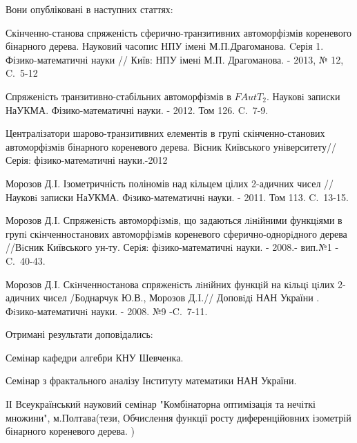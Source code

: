 \documentclass[a4paper,12pt]{article} \usepackage{a4wide}
\numberwithin{equation}{subsection}
\begin{document}
 Вони опубліковані в наступних статтях:


{ Скінченно-станова спряженість сферично-транзитивних
  автоморфізмів кореневого бінарного дерева.
Науковий часопис НПУ імені М.П.Драгоманова. Cерія 1.
Фізико-математичні науки // Київ: НПУ імені М.П. Драгоманова. -
2013, № 12, C.~5-12}


{ Спряженість транзитивно-стабільних
  автоморфізмів в $FAutT_2$.
Науковi записки
  НаУКМА. Фізико-математичні науки.  - 2012.  Том 126. C.~7-9. }


{ Централізатори шарово-транзитивних елементів в групі скінченно-станових автоморфізмів бінарного кореневого дерева.
Вісник Київського університету//Серія: фізико-математичні науки.-2012}

{ Морозов Д.I.  Ізометричність поліномів над кільцем цілих
  2-адичних чисел //Науковi записки НаУКМА. Фiзико-математичнi
  науки. - 2011.  Том 113. C.~13-15. }


{ Морозов  Д.I.  Спряженiсть  автоморфiзмiв,  що
задаються лiнiйними функцiями в групi скiнченностанових
автоморфiзмiв кореневого сферично-однорiдного дерева   //Вiсник
Київського   ун-ту. Серiя: фiзико-математичнi науки. - 2008.-
вип.№1 - C.~40-43.}


{ Морозов Д.I.  Скiнченностанова спряженiсть лiнiйних
  функцiй на кiльцi цiлих 2-адичних чисел /Боднарчук Ю.В., Морозов
  Д.I.// Доповiдi НАН України .  Фiзико-математичнi науки. - 2008. №9
  -C.~7-11. }

\bigskip

 Отримані результати доповідались:




 Семінар  кафедри алгебри КНУ Шевченка.

 Семінар з фрактального аналізу Інституту математики НАН України.

IІ Всеукраїнський науковий семінар 
"Комбінаторна оптимізація та нечіткі множини", м.Полтава(тези,  Обчислення функції росту диференційовних ізометрій бінарного кореневого дерева. )
\end{document}
